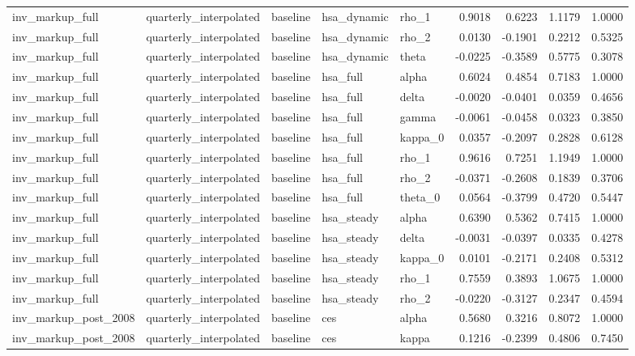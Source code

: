 \begin{tabular}{lllllrrrr}
inv\_markup\_full & quarterly\_interpolated & baseline & hsa\_dynamic & rho\_1 & 0.9018 & 0.6223 & 1.1179 & 1.0000 \\
inv\_markup\_full & quarterly\_interpolated & baseline & hsa\_dynamic & rho\_2 & 0.0130 & -0.1901 & 0.2212 & 0.5325 \\
inv\_markup\_full & quarterly\_interpolated & baseline & hsa\_dynamic & theta & -0.0225 & -0.3589 & 0.5775 & 0.3078 \\
inv\_markup\_full & quarterly\_interpolated & baseline & hsa\_full & alpha & 0.6024 & 0.4854 & 0.7183 & 1.0000 \\
inv\_markup\_full & quarterly\_interpolated & baseline & hsa\_full & delta & -0.0020 & -0.0401 & 0.0359 & 0.4656 \\
inv\_markup\_full & quarterly\_interpolated & baseline & hsa\_full & gamma & -0.0061 & -0.0458 & 0.0323 & 0.3850 \\
inv\_markup\_full & quarterly\_interpolated & baseline & hsa\_full & kappa\_0 & 0.0357 & -0.2097 & 0.2828 & 0.6128 \\
inv\_markup\_full & quarterly\_interpolated & baseline & hsa\_full & rho\_1 & 0.9616 & 0.7251 & 1.1949 & 1.0000 \\
inv\_markup\_full & quarterly\_interpolated & baseline & hsa\_full & rho\_2 & -0.0371 & -0.2608 & 0.1839 & 0.3706 \\
inv\_markup\_full & quarterly\_interpolated & baseline & hsa\_full & theta\_0 & 0.0564 & -0.3799 & 0.4720 & 0.5447 \\
inv\_markup\_full & quarterly\_interpolated & baseline & hsa\_steady & alpha & 0.6390 & 0.5362 & 0.7415 & 1.0000 \\
inv\_markup\_full & quarterly\_interpolated & baseline & hsa\_steady & delta & -0.0031 & -0.0397 & 0.0335 & 0.4278 \\
inv\_markup\_full & quarterly\_interpolated & baseline & hsa\_steady & kappa\_0 & 0.0101 & -0.2171 & 0.2408 & 0.5312 \\
inv\_markup\_full & quarterly\_interpolated & baseline & hsa\_steady & rho\_1 & 0.7559 & 0.3893 & 1.0675 & 1.0000 \\
inv\_markup\_full & quarterly\_interpolated & baseline & hsa\_steady & rho\_2 & -0.0220 & -0.3127 & 0.2347 & 0.4594 \\
inv\_markup\_post\_2008 & quarterly\_interpolated & baseline & ces & alpha & 0.5680 & 0.3216 & 0.8072 & 1.0000 \\
inv\_markup\_post\_2008 & quarterly\_interpolated & baseline & ces & kappa & 0.1216 & -0.2399 & 0.4806 & 0.7450 \\

\end{tabular}
